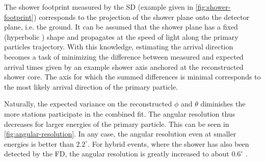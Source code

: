 The shower footprint measured by the SD (example given in \autoref{fig:shower-footprint}) corresponds to the projection of the shower plane onto the detector 
plane, i.e. the ground. It can be assumed that the shower plane has a fixed (hyperbolic \cite{bonifazi2005angular}) shape and propagates at the speed of light 
along the primary particles trajectory. With this knowledge, estimating the arrival direction becomes a task of minimizing the difference between measured and
expected arrival times given by an example shower axis anchored at the reconstructed shower core. The axis for which the summed differences is minimal corresponds
to the most likely arrival direction of the primary particle.

Naturally, the expected variance on the reconstructed $\phi$ and $\theta$ diminishes the more stations participate in the combined fit. The angular resolution thus
decreases for larger energies of the primary particle. This can be seen in \autoref{fig:angular-resolution}. In any case, the angular resolution even at smaller 
energies is better than $2.2^\circ$. For hybrid events, where the shower has also been detected by the FD, the angular resolution is greatly increased to about 
$0.6^\circ$ \cite{bonifazi2005angular}.

